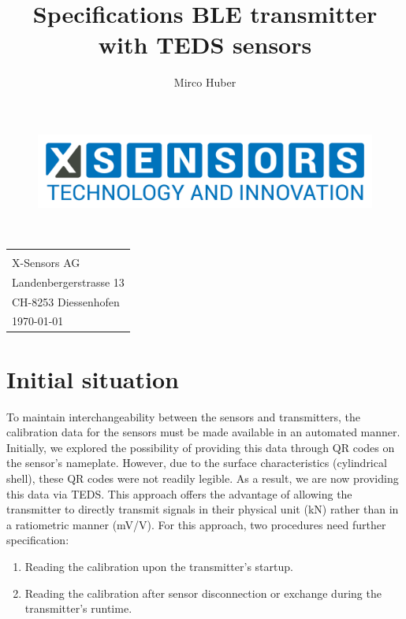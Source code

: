 \documentclass[12pt,a4paper]{article}
\author{Mirco Huber}
\title{Specifications BLE transmitter with TEDS sensors}
\newcommand{\subtitle}{}
\begin{document}
	\thispagestyle{empty}
	\begin{titlepage}
		\begin{figure}[H]
			\centering
			\includegraphics[width=.5\linewidth]{Logos/X-SENSORS-Logo_Slogan_EN_Transparent.png}
		\end{figure}
		\vspace*{3cm}
		\begin{center}
			\Huge {\thetitle} \\\vspace*{.5cm}
			\small {\subtitle}
		\end{center}
		\vspace{12cm}
		\hspace{.6\linewidth} 
		\begin{tabular}{l}	
			\small{\theauthor} \\[.5pt]  
			\small{X-Sensors AG} \\ 
			\small{Landenbergerstrasse 13} \\
			\small{CH-8253 Diessenhofen} \\ [.5cm] 	
			\today
		\end{tabular}
	\end{titlepage}

	\setcounter{page}{1}
	\pagestyle{fancy}
	
	
	
	\section{Initial situation}
	To maintain interchangeability between the sensors and transmitters, the calibration data for the sensors must be made available in an automated manner. Initially, we explored the possibility of providing this data through QR codes on the sensor's nameplate. However, due to the surface characteristics (cylindrical shell), these QR codes were not readily legible. As a result, we are now providing this data via TEDS. This approach offers the advantage of allowing the transmitter to directly transmit signals in their physical unit (kN) rather than in a ratiometric manner (mV/V).
	For this approach, two procedures need further specification:
	\begin{enumerate}
		\item Reading the calibration upon the transmitter's startup.
		\item Reading the calibration after sensor disconnection or exchange during the transmitter's runtime.
	\end{enumerate}
	\newpage
\end{document}
